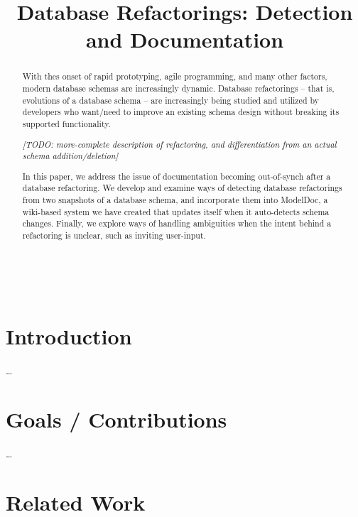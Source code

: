 \documentclass{acm_proc_article-sp}
\begin{document}
\title{Database Refactorings: Detection and Documentation}

\maketitle

\begin{abstract}
With thes onset of rapid prototyping, agile programming, and many other factors,
modern database schemas are increasingly dynamic.  Database refactorings --
that is, evolutions of a database schema -- are increasingly being studied and
utilized by developers who want/need to improve an existing schema design
without breaking its supported functionality.

\textit{[TODO: more-complete description of refactoring, and differentiation
from an actual schema addition/deletion]}

In this paper, we address the issue of documentation becoming out-of-synch
after a database refactoring.  We develop and examine ways of detecting
database refactorings from two snapshots of a database schema, and incorporate
them into ModelDoc, a wiki-based system we have created that updates itself
when it auto-detects schema changes.  Finally, we explore ways of handling
ambiguities when the intent behind a refactoring is unclear, such as inviting
user-input.
\end{abstract}

 \\


\section{Introduction}

\ldots

\section{Goals / Contributions}

\ldots

\section{Related Work}
\end{document}
